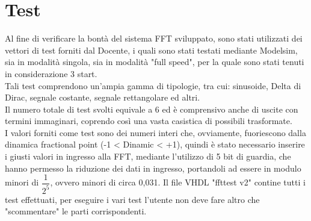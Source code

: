 \documentclass[a4paper, titlepage]{article}
\begin{document}
\section{Test} %
Al fine di verificare la bontà del sistema FFT sviluppato, sono stati utilizzati dei vettori di test forniti dal Docente, i quali sono stati testati mediante Modelsim, sia in modalità singola, sia in modalità "full speed", per la quale sono stati tenuti in considerazione 3 start.\\Tali test comprendono un'ampia gamma di tipologie, tra cui: sinusoide, Delta di Dirac, segnale costante, segnale rettangolare ed altri.\\Il numero totale di test svolti equivale a 6 ed è comprensivo anche di uscite con termini immaginari, coprendo così una vasta casistica di possibili trasformate.\\I valori forniti come test sono dei numeri interi che, ovviamente, fuoriescono dalla dinamica fractional point (-1 < Dinamic < +1), quindi è stato necessario inserire i giusti valori in ingresso alla FFT, mediante l'utilizzo di 5 bit di guardia, che hanno permesso la riduzione dei dati in ingresso, portandoli ad essere in modulo minori di $\dfrac{1}{2^5}$, ovvero minori di circa 0,031. Il file VHDL "fft\textunderscore test \textunderscore v2" contine tutti i test effettuati, per eseguire i vari test l'utente non deve fare altro che "scommentare" le parti corrispondenti.
\end{document}
